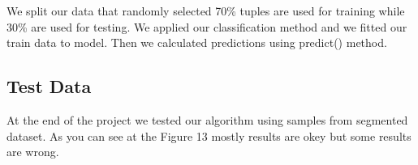 \documentclass[onecolumn]{article}
\begin{document}
We split our data that randomly selected 70\% tuples are used for training while 30\% are used for testing. We applied our classification method and we fitted our train data to model. Then we calculated predictions using predict() method.
 
 \subsection{Test Data}
 At the end of the project we tested our algorithm using samples from segmented dataset. As you can see at the Figure 13 mostly results are okey but some results are wrong.
 
\begin{figure}[H]
    \centering
    \subfloat
    \qquad
    \subfloat
    \qquad
    \subfloat
    \qquad
    \subfloat

\end{figure}
\end{document}
